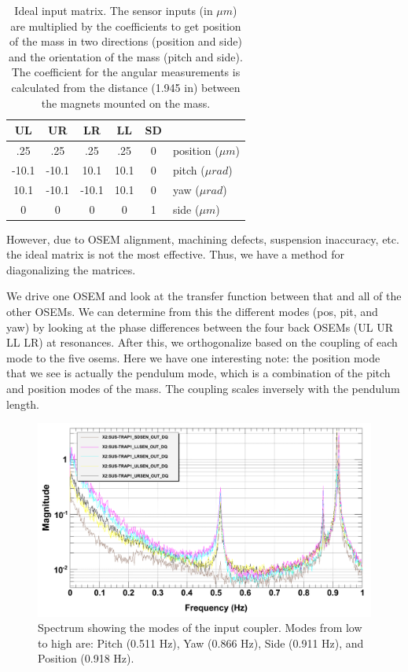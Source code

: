 \begin{table}[hp]
\centering
\begin{tabular}{| c | c | c |c | c | l}
\bf{UL}& \bf{UR} & \bf{LR}  & \bf{LL} & \bf{SD}\\ \hline
  .25 & .25 & .25 & .25 & 0 &position ($\mu m$)\\
 -10.1 &-10.1 & 10.1 & 10.1 & 0 &pitch ($\mu rad$)\\
  10.1 &-10.1 &-10.1 & 10.1 & 0 &yaw ($\mu rad$)\\
  0 & 0 & 0 & 0 & 1 &side ($\mu m$)\\ \hline
\end{tabular}
\caption[Ideal diagonalization]{Ideal input matrix. The sensor inputs (in $\mu m$) are multiplied by the coefficients to get position of the mass in two directions (position and side) and the orientation of the mass (pitch and side). The coefficient for the angular measurements is calculated from the distance (1.945 in) between the magnets mounted on the mass.}
\label{tab:idealDiag}
\end{table}

However, due to OSEM alignment, machining defects, suspension inaccuracy, etc. the ideal matrix is not the most effective. Thus, we have a method for diagonalizing the matrices.

We drive one OSEM and look at the transfer function between that and all of the other OSEMs. We can determine from this the different modes (pos, pit, and yaw) by looking at the phase differences between the four back OSEMs (UL UR LL LR) at resonances. After this, we orthogonalize based on the coupling of each mode to the five osems. Here we have one interesting note: the position mode that we see is actually the pendulum mode, which is a combination of the pitch and position modes of the mass. The coupling scales inversely with the pendulum length.

\begin{figure}[p]
	\centering
		\includegraphics[width=.95\textwidth]{figures/suspensions/trap1spec.png}
	\caption[Input coupler spectrum]{Spectrum showing the modes of the input coupler.  Modes from low to high are: Pitch (0.511 Hz), Yaw (0.866 Hz), Side (0.911 Hz), and Position (0.918 Hz). }
	\label{fig:trap1spec}
\end{figure}


